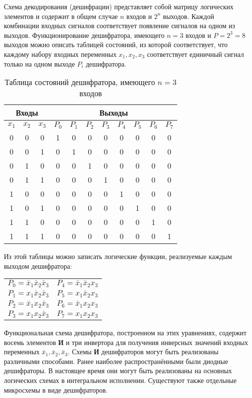 \documentclass[10pt,a4paper,titlepage]{article}
\begin{document}
Схема декодирования (дешифрации) представляет собой матрицу логических элементов и содержит в общем случае $n$ входов и $2^n$ выходов.
Каждой комбинации входных сигналов соответствует появление сигналов на одном из выходов.
Функционирование дешифратора, имеющего $n=3$ входов и $P=2^3=8$ выходов можно описать таблицей состояний, из которой соответствует, что каждому набору входных переменных $x_1, x_2, x_3$ соответствует единичный сигнал только на одном выходе $P_i$ дешифратора.
\begin{longtable}{|c|c|c|c|c|c|c|c|c|c|c|}
\caption{Таблица состояний дешифратора, имеющего $n=3$ входов}\\
\hline
\multicolumn{3}{|c|}{Входы}	&	\multicolumn{8}{|c|}{Выходы}\\
\hline
$x_1$	&	$x_2$	&	$x_3$	&	$P_0$	&	$P_1$	&	$P_2$	&	$P_3$	&	$P_4$	&	$P_5$	&	$P_6$	&	$P_7$\\
\hline
0	&	0	&	0	&	1	&	0	&	0	&	0	&	0	&	0	&	0	&	0\\
0	&	0	&	1	&	0	&	1	&	0	&	0	&	0	&	0	&	0	&	0\\
0	&	1	&	0	&	0	&	0	&	1	&	0	&	0	&	0	&	0	&	0\\
0	&	1	&	1	&	0	&	0	&	0	&	1	&	0	&	0	&	0	&	0\\
1	&	0	&	0	&	0	&	0	&	0	&	0	&	1	&	0	&	0	&	0\\
1	&	0	&	1	&	0	&	0	&	0	&	0	&	0	&	1	&	0	&	0\\
1	&	1	&	0	&	0	&	0	&	0	&	0	&	0	&	0	&	1	&	0\\
1	&	1	&	1	&	0	&	0	&	0	&	0	&	0	&	0	&	0	&	1\\
\hline
\end{longtable}

Из этой таблицы можно записать логические функции, реализуемые каждым выходом дешифратора:

\begin{tabular}{ll}
$P_0=\bar x_1 \bar x_2 \bar x_3 $	&	$P_4=\bar x_1 \bar x_2 x_3$\\
$P_1=x_1\bar x_2 \bar x_3 $	&	$P_5=x_1\bar x_2 x_3$\\
$P_2=\bar x_1 x_2\bar x_3$	&	$P_6=\bar x_1 x_2 x_3$\\
$P_3=x_1 x_2\bar x_3$	&	$P_7=x_1 x_2 x_3$\\
\end{tabular}

Функциональная схема дешифратора, построенном на этих уравнениях, содержит восемь элементов \textbf{И} и три инвертора для получения инверсных значений входных переменных $\bar x_1, \bar x_2,\bar x_3$.
Схемы \textbf{И} дешифраторов могут быть реализованы различными способами.
Ранее наиболее распространёнными были диодные дешифраторы. В настоящее время они могут быть реализованы на основных логических схемах в интегральном исполнении.
Существуют также отдельные микросхемы в виде дешифраторов.
\end{document}
